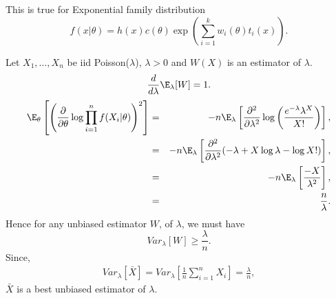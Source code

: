 \documentclass[a4paper,english,12pt]{article}
\begin{document}
\begin{note}
This is true for Exponential family distribution
\begin{equation*}
f(x|\theta)=h(x)c(\theta)\exp\left(\sum_{i=1}^{k}w_i(\theta)t_i(x)\right).
\end{equation*}
\end{note}
\begin{exmp}
\par Let $X_1,\dots,X_n$ be iid Poisson($\lambda$), $\lambda>0$ and $W(X)$ is an estimator of $\lambda$.
\begin{equation*}
\frac{d}{d\lambda}\E_\lambda[W] = 1.
\end{equation*}
\begin{eqnarray*}
\E_\theta\left[\left(\frac{\partial}{\partial\theta} \log \prod_{i=1}^{n} f(X_i|\theta)\right)^2\right] &=& 
-n\E_\lambda\left[\frac{\partial^2}{\partial\lambda^2}\log\left(\frac{e^{-\lambda}\lambda^X}{X!}\right)\right], \\ &=& -n\E_\lambda\left[\frac{\partial^2}{\partial\lambda^2}(-\lambda+X\log\lambda-\log X!)\right], \\
&=&-n\E_\lambda\left[\frac{-X}{\lambda^2}\right], \\
&=&\frac{n}{\lambda}.
\end{eqnarray*}
Hence for any unbiased estimator $W$, of $\lambda$, we must have
\begin{equation}
Var_\lambda[W] \geq \frac{\lambda}{n}.
\end{equation}
Since,
\begin{eqnarray}
Var_\lambda[\bar{X}] = Var_\lambda[\frac{1}{n}\sum_{i=1}^{n}X_i]=\frac{\lambda}{n},
\end{eqnarray}
$\bar{X}$ is a best unbiased estimator of $\lambda$.
\end{exmp}
\end{document}

